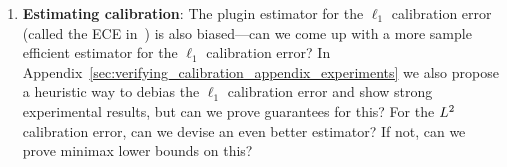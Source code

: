 \begin{enumerate}
\item \textbf{Estimating calibration}: The plugin estimator for the $\ell_1$ calibration error (called the ECE in~\cite{guo2017calibration, nixon2019calibration}) is also biased---can we come up with a more sample efficient estimator for the $\ell_1$ calibration error? In Appendix~\ref{sec:verifying_calibration_appendix_experiments} we also propose a heuristic way to debias the $\ell_1$ calibration error and show strong experimental results, but can we prove guarantees for this? For the $L^2$ calibration error, can we devise an even better estimator? If not, can we prove minimax lower bounds on this?
\end{enumerate}

